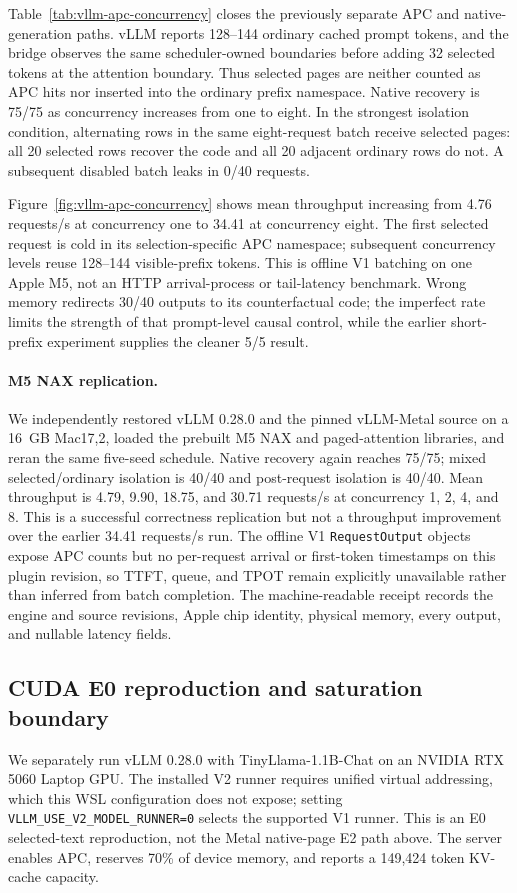 \documentclass[10pt]{article}
\begin{document}
Table~\ref{tab:vllm-apc-concurrency} closes the previously separate APC and
native-generation paths. vLLM reports 128--144 ordinary cached prompt tokens,
and the bridge observes the same scheduler-owned boundaries before adding 32
selected tokens at the attention boundary. Thus selected pages are neither
counted as APC hits nor inserted into the ordinary prefix namespace. Native
recovery is 75/75 as concurrency increases from one to eight. In the strongest
isolation condition, alternating rows in the same eight-request batch receive
selected pages: all 20 selected rows recover the code and all 20 adjacent
ordinary rows do not. A subsequent disabled batch leaks in 0/40 requests.

Figure~\ref{fig:vllm-apc-concurrency} shows mean throughput increasing from
4.76 requests/s at concurrency one to 34.41 at concurrency eight. The first
selected request is cold in its selection-specific APC namespace; subsequent
concurrency levels reuse 128--144 visible-prefix tokens. This is
offline V1 batching on one Apple M5, not an HTTP arrival-process or tail-latency
benchmark. Wrong memory redirects 30/40 outputs to its counterfactual code;
the imperfect rate limits the strength of that prompt-level causal control,
while the earlier short-prefix experiment supplies the cleaner 5/5 result.

\paragraph{M5 NAX replication.}
We independently restored vLLM 0.28.0 and the pinned vLLM-Metal source on a
16~GB Mac17,2, loaded the prebuilt M5 NAX and paged-attention libraries, and
reran the same five-seed schedule. Native recovery again reaches 75/75;
mixed selected/ordinary isolation is 40/40 and post-request isolation is
40/40. Mean throughput is 4.79, 9.90, 18.75, and 30.71 requests/s at
concurrency 1, 2, 4, and 8. This is a successful correctness replication but
not a throughput improvement over the earlier 34.41 requests/s run. The
offline V1 \texttt{RequestOutput} objects expose APC counts but no per-request
arrival or first-token timestamps on this plugin revision, so TTFT, queue, and
TPOT remain explicitly unavailable rather than inferred from batch completion.
The machine-readable receipt records the engine and source revisions, Apple
chip identity, physical memory, every output, and nullable latency fields.

\subsection{CUDA E0 reproduction and saturation boundary}
We separately run vLLM 0.28.0 with TinyLlama-1.1B-Chat on an NVIDIA RTX 5060
Laptop GPU. The installed V2 runner requires unified virtual addressing, which
this WSL configuration does not expose; setting
\texttt{VLLM\_USE\_V2\_MODEL\_RUNNER=0} selects the supported V1 runner. This
is an E0 selected-text reproduction, not the Metal native-page E2 path above.
The server enables APC, reserves 70\% of device memory, and reports a 149,424
token KV-cache capacity.
\end{document}

